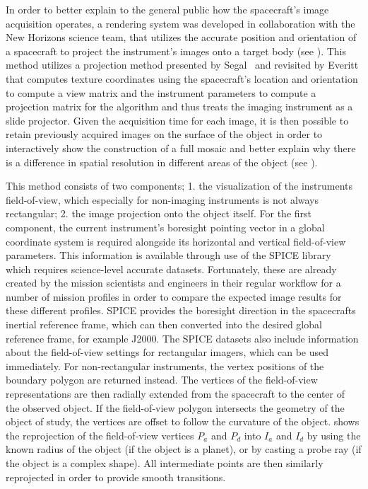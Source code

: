 In order to better explain to the general public how the spacecraft's image acquisition operates, a rendering system was developed in collaboration with the New Horizons science team, that utilizes the accurate position and orientation of a spacecraft to project the instrument's images onto a target body (see ).  This method utilizes a projection method presented by Segal~\cite{segal1992fast} and revisited by Everitt \cite{everitt2001projective} that computes texture coordinates using the spacecraft's location and orientation to compute a view matrix and the instrument parameters to compute a projection matrix for the algorithm and thus treats the imaging instrument as a slide projector.  Given the acquisition time for each image, it is then possible to retain previously acquired images on the surface of the object in order to interactively show the construction of a full mosaic and better explain why there is a difference in spatial resolution in different areas of the object (see ).

This method consists of two components; 1. the visualization of the instruments field-of-view, which especially for non-imaging instruments is not always rectangular; 2. the image projection onto the object itself.  For the first component, the current instrument's boresight pointing vector in a global coordinate system is required alongside its horizontal and vertical field-of-view parameters.  This information is available through use of the SPICE library~\cite{acton1996ancillary} which requires science-level accurate datasets. Fortunately, these are already created by the mission scientists and engineers in their regular workflow for a number of mission profiles in order to compare the expected image results for these different profiles.  SPICE provides the boresight direction in the spacecrafts inertial reference frame, which can then converted into the desired global reference frame, for example J2000.  The SPICE datasets also include information about the field-of-view settings for rectangular imagers, which can be used immediately.  For non-rectangular instruments, the vertex positions of the boundary polygon are returned instead.  The vertices of the field-of-view representations are then radially extended from the spacecraft to the center of the observed object.  If the field-of-view polygon intersects the geometry of the object of study, the vertices are offset to follow the curvature of the object.   shows the reprojection of the field-of-view vertices $P_a$ and $P_d$ into $I_a$ and $I_d$ by using the known radius of the object (if the object is a planet), or by casting a probe ray (if the object is a complex shape).  All intermediate points are then similarly reprojected in order to provide smooth transitions.

